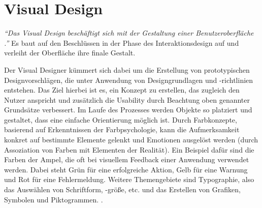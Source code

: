 \section{Visual Design} \label{sec:uid}
\textit{\enquote{Das Visual Design beschäftigt sich mit der Gestaltung einer Benutzeroberfläche \cite[S. 182]{Ullenboom2014}.}} Es baut auf den Beschlüssen in der Phase des Interaktionsdesign auf und verleiht der Oberfläche ihre finale Gestalt.\par
Der Visual Designer kümmert sich dabei um die Erstellung von prototypischen Designvorschlägen, die unter Anwendung von Designgrundlagen und -richtlinien entstehen. Das Ziel hierbei ist es, ein Konzept zu erstellen, das zugleich den Nutzer anspricht und zusätzlich die Usability durch Beachtung oben genannter Grundsätze verbessert. Im Laufe des Prozesses werden Objekte so platziert und gestaltet, dass eine einfache Orientierung möglich ist. Durch Farbkonzepte, basierend auf Erkenntnissen der Farbpsychologie, kann die Aufmerksamkeit konkret auf bestimmte Elemente gelenkt und Emotionen ausgelöst werden (durch Assoziation von Farben mit Elementen der Realität). Ein Beispiel dafür sind die Farben der Ampel, die oft bei visuellem Feedback einer Anwendung verwendet werden. Dabei steht Grün für eine erfolgreiche Aktion, Gelb für eine Warnung und Rot für eine Fehlermeldung. Weitere Themengebiete sind Typographie, also das Auswählen von Schriftform, -größe, etc. und das Erstellen von Grafiken, Symbolen und Piktogrammen. \cite[S. 182]{Ullenboom2014}.

